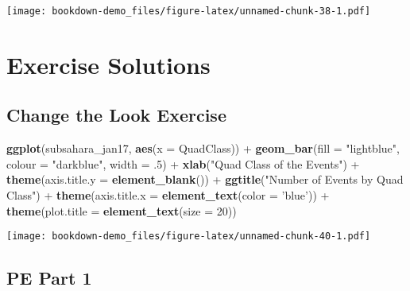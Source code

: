 \documentclass[]{book}
\newenvironment{Shaded}{\begin{snugshade}}{\end{snugshade}}
\newcommand{\KeywordTok}[1]{\textcolor[rgb]{0.13,0.29,0.53}{\textbf{{#1}}}}
\newcommand{\DataTypeTok}[1]{\textcolor[rgb]{0.13,0.29,0.53}{{#1}}}
\newcommand{\DecValTok}[1]{\textcolor[rgb]{0.00,0.00,0.81}{{#1}}}
\newcommand{\StringTok}[1]{\textcolor[rgb]{0.31,0.60,0.02}{{#1}}}
\newcommand{\NormalTok}[1]{{#1}}
\theoremstyle{definition}
\theoremstyle{definition}
\theoremstyle{remark}
\begin{document}
\texttt{[image: bookdown-demo\_files/figure-latex/unnamed-chunk-38-1.pdf]}

\chapter{Exercise Solutions}\label{exercise-solutions}

\section{Change the Look Exercise}\label{change-the-look-exercise-1}

\begin{Shaded}
\begin{Highlighting}[]
\KeywordTok{ggplot}\NormalTok{(subsahara_jan17, }\KeywordTok{aes}\NormalTok{(}\DataTypeTok{x =} \NormalTok{QuadClass)) +}
\StringTok{  }\KeywordTok{geom_bar}\NormalTok{(}\DataTypeTok{fill =} \StringTok{"lightblue"}\NormalTok{, }\DataTypeTok{colour =} \StringTok{"darkblue"}\NormalTok{, }\DataTypeTok{width =} \NormalTok{.}\DecValTok{5}\NormalTok{) +}
\StringTok{  }\KeywordTok{xlab}\NormalTok{(}\StringTok{"Quad Class of the Events"}\NormalTok{) +}
\StringTok{  }\KeywordTok{theme}\NormalTok{(}\DataTypeTok{axis.title.y =} \KeywordTok{element_blank}\NormalTok{()) +}
\StringTok{  }\KeywordTok{ggtitle}\NormalTok{(}\StringTok{"Number of Events by Quad Class"}\NormalTok{) +}
\StringTok{  }\KeywordTok{theme}\NormalTok{(}\DataTypeTok{axis.title.x =} \KeywordTok{element_text}\NormalTok{(}\DataTypeTok{color =} \StringTok{'blue'}\NormalTok{)) +}
\StringTok{  }\KeywordTok{theme}\NormalTok{(}\DataTypeTok{plot.title =} \KeywordTok{element_text}\NormalTok{(}\DataTypeTok{size =} \DecValTok{20}\NormalTok{))}
\end{Highlighting}
\end{Shaded}

\texttt{[image: bookdown-demo\_files/figure-latex/unnamed-chunk-40-1.pdf]}

\section{PE Part 1}\label{pe-part-1}
\end{document}

